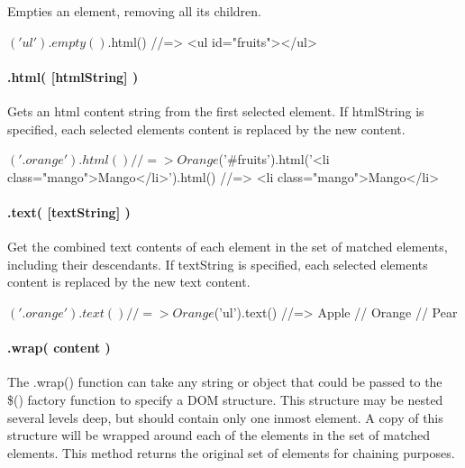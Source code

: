 Empties an element, removing all its children.


\begin{DoxyCode}
$('ul').empty()
$.html()
//=>  <ul id="fruits"></ul>
\end{DoxyCode}


\paragraph*{.html( \mbox{[}html\+String\mbox{]} )}

Gets an html content string from the first selected element. If {\ttfamily html\+String} is specified, each selected element\textquotesingle{}s content is replaced by the new content.


\begin{DoxyCode}
$('.orange').html()
//=> Orange

$('#fruits').html('<li class="mango">Mango</li>').html()
//=> <li class="mango">Mango</li>
\end{DoxyCode}


\paragraph*{.text( \mbox{[}text\+String\mbox{]} )}

Get the combined text contents of each element in the set of matched elements, including their descendants. If {\ttfamily text\+String} is specified, each selected element\textquotesingle{}s content is replaced by the new text content.


\begin{DoxyCode}
$('.orange').text()
//=> Orange

$('ul').text()
//=>  Apple
//    Orange
//    Pear
\end{DoxyCode}


\paragraph*{.wrap( content )}

The .wrap() function can take any string or object that could be passed to the \$() factory function to specify a D\+OM structure. This structure may be nested several levels deep, but should contain only one inmost element. A copy of this structure will be wrapped around each of the elements in the set of matched elements. This method returns the original set of elements for chaining purposes.


